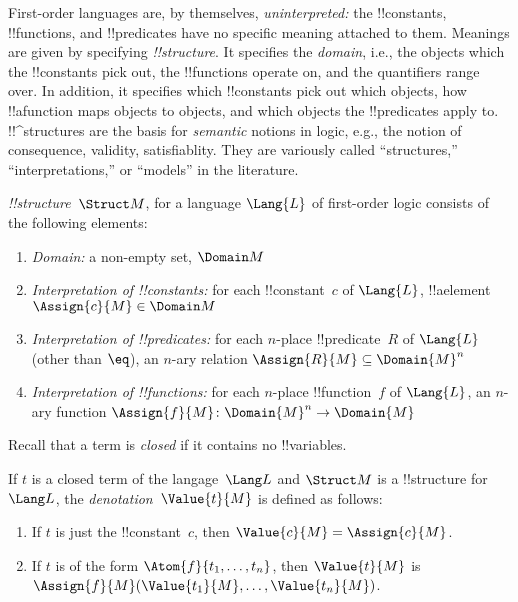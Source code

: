 \documentclass[../../include/open-logic-section]{subfiles}
\begin{document}

\begin{explain}
First-order languages are, by themselves, \emph{uninterpreted:} the
!!{constant}s, !!{function}s, and !!{predicate}s have no specific
meaning attached to them.  Meanings are given by specifying
 \emph{!!{structure}}. It specifies the
\emph{domain}, i.e., the objects which the !!{constant}s pick out, the
!!{function}s operate on, and the quantifiers range over. In addition,
it specifies which !!{constant}s pick out which objects, how
!!a{function} maps objects to objects, and which objects the
!!{predicate}s apply to.  !!^{structure}s are the basis for
\emph{semantic} notions in logic, e.g., the notion of consequence,
validity, satisfiablity. They are variously called ``structures,''
``interpretations,'' or ``models'' in the literature.
\end{explain}

\begin{defn}[!!^{structure}s]
 \emph{!!{structure}}~$\Struct M$, for a language
$\Lang{L}$ of first-order logic consists of the following elements:
\begin{enumerate}
\item \emph{Domain:} a non-empty set, $\Domain M$ 
\item \emph{Interpretation of !!{constant}s:} for each !!{constant}~$c$ of
  $\Lang{L}$, !!a{element} $\Assign{c}{M} \in \Domain M$
\item \emph{Interpretation of !!{predicate}s:} for each $n$-place
  !!{predicate}~$R$ of $\Lang{L}$ (other than $\eq$), an $n$-ary
  relation $\Assign{R}{M} \subseteq \Domain{M}^n$
\item \emph{Interpretation of !!{function}s:} for each $n$-place
  !!{function}~$f$ of $\Lang{L}$, an $n$-ary function $\Assign{f}{M}
  \colon \Domain{M}^n \to \Domain{M}$
\end{enumerate}
\end{defn}

\begin{explain}
Recall that a term is \emph{closed} if it contains no !!{variable}s.
\end{explain}

\begin{defn}
If $t$ is a closed term of the langage~$\Lang L$ and $\Struct M$ is a
!!{structure} for~$\Lang L$, the \emph{denotation}~$\Value{t}{M}$ is
defined as follows:
\begin{enumerate}
\item If $t$ is just the !!{constant}~$c$, then $\Value{c}{M} = \Assign{c}{M}$.
\item If $t$ is of the form $\Atom{f}{t_1, \ldots, t_n}$, then
  $\Value{t}{M}$ is $\Assign{f}{M}(\Value{t_1}{M}, \ldots,
  \Value{t_n}{M})$.
\end{enumerate}
\end{defn}
\end{document}
